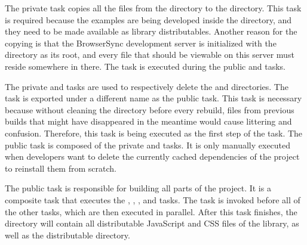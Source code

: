 The private  task copies all the files from the  directory to the  directory.
This task is required because the examples are being developed inside the  directory, and they need to be made available as library distributables.
Another reason for the copying is that the BrowserSync development server is initialized with the  directory as its root, and every file that should be viewable on this server must reside somewhere in there.
The  task is executed during the public  and  tasks.

The private  and  tasks are used to respectively delete the  and  directories.
The  task is exported under a different name as the public  task.
This task is necessary because without cleaning the  directory before every rebuild, files from previous builds that might have disappeared in the meantime would cause littering and confusion.
Therefore, this task is being executed as the first step of the  task.
The public  task is composed of the private  and  tasks.
It is only manually executed when developers want to delete the currently cached dependencies of the project to reinstall them from scratch.

The public  task is responsible for building all parts of the project.
It is a composite task that executes the , , , and  tasks.
The  task is invoked before all of the other tasks, which are then executed in parallel.
After this task finishes, the  directory will contain all distributable JavaScript and CSS files of the library, as well as the distributable  directory.


